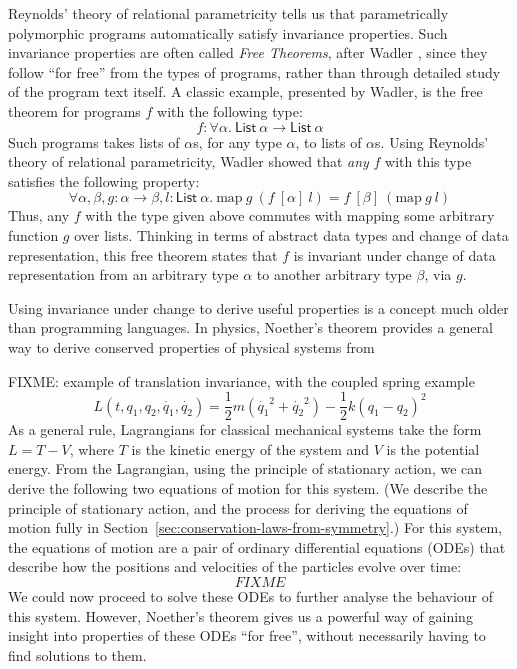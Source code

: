 \documentclass[preprint]{sigplanconf}
\theoremstyle{examplestyle}
\begin{document}
Reynolds' theory of relational parametricity \cite{reynolds82} tells
us that parametrically polymorphic programs automatically satisfy
invariance properties. Such invariance properties are often called
\emph{Free Theorems}, after Wadler \cite{wadler89theorems}, since they
follow ``for free'' from the types of programs, rather than through
detailed study of the program text itself. A classic example,
presented by Wadler, is the free theorem for programs $f$ with the
following type:
\begin{displaymath}
  f : \forall \alpha.~\mathsf{List}~\alpha \to \mathsf{List}~\alpha
\end{displaymath}
Such programs takes lists of $\alpha$s, for any type $\alpha$, to
lists of $\alpha$s. Using Reynolds' theory of relational
parametricity, Wadler showed that \emph{any} $f$ with this type
satisfies the following property:
\begin{displaymath}
  \forall \alpha, \beta, g : \alpha \to \beta, l : \mathsf{List}~\alpha.~\mathrm{map}~g~(f~[\alpha]~l) = f~[\beta]~(\mathrm{map}~g~l)
\end{displaymath}
Thus, any $f$ with the type given above commutes with mapping some
arbitrary function $g$ over lists. Thinking in terms of abstract data
types and change of data representation, this free theorem states that
$f$ is invariant under change of data representation from an arbitrary
type $\alpha$ to another arbitrary type $\beta$, via $g$.

Using invariance under change to derive useful properties is a concept
much older than programming languages. In physics, Noether's theorem
\cite{noether} provides a general way to derive conserved properties
of physical systems from 




FIXME: example of translation invariance, with the coupled spring example
\begin{equation}\label{eq:coupled-spring-langrangian}
  L(t,q_1,q_2,\dot{q_1},\dot{q_2}) = \frac{1}{2}m(\dot{q_1}^2 + \dot{q_2}^2) - \frac{1}{2}k(q_1 - q_2)^2
\end{equation}
As a general rule, Lagrangians for classical mechanical systems take
the form $L = T - V$, where $T$ is the kinetic energy of the system
and $V$ is the potential energy. From the Lagrangian, using the
principle of stationary action, we can derive the following two
equations of motion for this system. (We describe the principle of
stationary action, and the process for deriving the equations of
motion fully in Section~\ref{sec:conservation-laws-from-symmetry}.)
For this system, the equations of motion are a pair of ordinary
differential equations (ODEs) that describe how the positions and
velocities of the particles evolve over time:
\begin{displaymath}
  FIXME
\end{displaymath}
We could now proceed to solve these ODEs to further analyse the
behaviour of this system. However, Noether's theorem gives us a
powerful way of gaining insight into properties of these ODEs ``for
free'', without necessarily having to find solutions to them.
\end{document}
